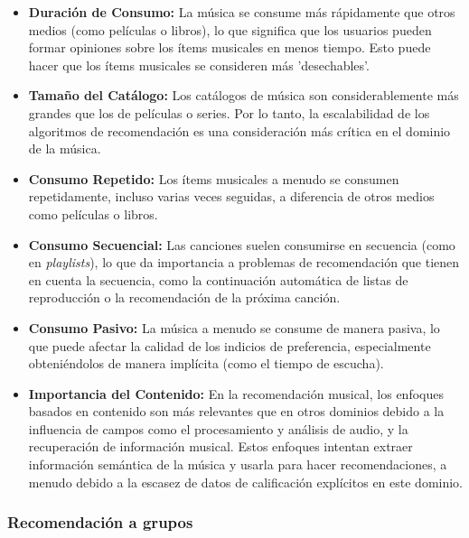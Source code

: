 \begin{itemize}
    \item \textbf{Duración de Consumo:} La música se consume más rápidamente que otros medios (como películas o libros), lo que significa que los usuarios
     pueden formar opiniones sobre los ítems musicales en menos tiempo. Esto puede hacer que los ítems musicales se consideren más 'desechables'.
    
    \item \textbf{Tamaño del Catálogo:} Los catálogos de música son considerablemente más grandes que los de películas o series. Por lo tanto, la 
    escalabilidad de los algoritmos de recomendación es una consideración más crítica en el dominio de la música.
    
    \item \textbf{Consumo Repetido:} Los ítems musicales a menudo se consumen repetidamente, incluso varias veces seguidas, a diferencia de otros medios
     como películas o libros.
    
    \item \textbf{Consumo Secuencial:} Las canciones suelen consumirse en secuencia (como en \textit{playlists}), lo que da importancia a problemas 
    de recomendación que tienen en cuenta la secuencia, como la continuación automática de listas de reproducción o la recomendación de la próxima canción.
    
    \item \textbf{Consumo Pasivo:} La música a menudo se consume de manera pasiva, lo que puede afectar la calidad de los indicios de preferencia,
    especialmente obteniéndolos de manera implícita (como el tiempo de escucha).
    
    \item \textbf{Importancia del Contenido:} En la recomendación musical, los enfoques basados en contenido son más relevantes que en otros dominios 
    debido a la influencia de campos como el procesamiento y análisis de audio, y la recuperación de información musical. Estos enfoques intentan extraer 
    información semántica de la música y usarla para hacer recomendaciones, a menudo debido a la escasez de datos de calificación explícitos en este 
    dominio.
\end{itemize}


\subsubsection{Recomendación a grupos\label{SEC:RECOMENDACION_GRUPOS}}

